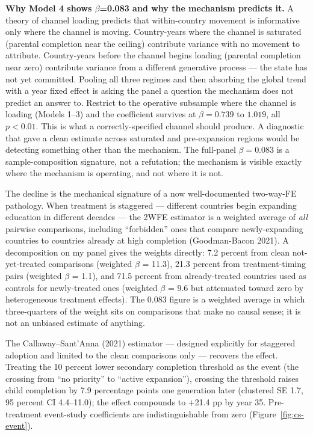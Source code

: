 \documentclass[12pt,letterpaper]{article}
\begin{document}
{\textbf{Why Model 4 shows $\beta$=0.083 and why the mechanism predicts
it.} A theory of channel loading predicts that within-country movement
is informative only where the channel is moving. Country-years where
the channel is saturated (parental completion near the ceiling)
contribute variance with no movement to attribute. Country-years
before the channel begins loading (parental completion near zero)
contribute variance from a different generative process --- the state
has not yet committed. Pooling all three regimes and then absorbing
the global trend with a year fixed effect is asking the panel a
question the mechanism does not predict an answer to. Restrict to the
operative subsample where the channel is loading (Models 1--3) and the
coefficient survives at $\beta=0.739$ to $1.019$, all $p<0.01$. This
is what a correctly-specified channel should produce. A diagnostic
that gave a clean estimate across saturated and pre-expansion regions
would be detecting something other than the mechanism. The full-panel
$\beta=0.083$ is a sample-composition signature, not a refutation; the
mechanism is visible exactly where the mechanism is operating, and not
where it is not.

The decline is the mechanical signature of a now well-documented
two-way-FE pathology. When treatment is staggered --- different
countries begin expanding education in different decades --- the 2WFE
estimator is a weighted average of \emph{all} pairwise comparisons,
including ``forbidden'' ones that compare newly-expanding countries
to countries already at high completion (Goodman-Bacon 2021). A
decomposition on my panel gives
the weights directly: 7.2 percent from clean not-yet-treated
comparisons (weighted $\beta$ = 11.3), 21.3 percent from
treatment-timing pairs (weighted $\beta$ = 1.1), and 71.5 percent
from already-treated countries used as controls for newly-treated
ones (weighted $\beta$ = 9.6 but attenuated toward zero by
heterogeneous treatment effects). The 0.083 figure is a weighted
average in which three-quarters of the weight sits on comparisons
that make no causal sense; it is not an unbiased estimate of anything.

The Callaway--Sant'Anna (2021) estimator --- designed explicitly for
staggered adoption and limited to the clean comparisons only ---
recovers the effect. Treating the 10 percent lower secondary
completion threshold as the event (the crossing from ``no priority''
to ``active expansion''), crossing the threshold raises child
completion by 7.9 percentage points one generation later (clustered
SE 1.7, 95 percent CI 4.4--11.0); the effect compounds to
$+$21.4 pp by year 35. Pre-treatment event-study coefficients are
indistinguishable from zero (Figure~\ref{fig:cs-event}).

}
\end{document}
